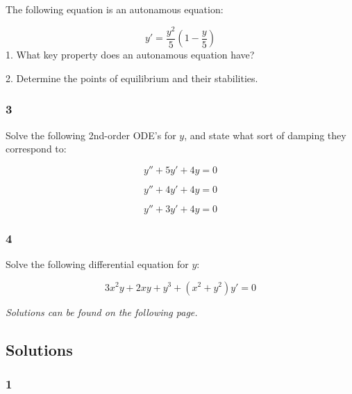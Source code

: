 The following equation is an autonamous equation:

\begin{equation}
    y'=\frac{y^2}{5}(1-\frac{y}{5})
\end{equation}
1. What key property does an autonamous equation have?


2. Determine the points of equilibrium and their stabilities.





\subsubsection{3}

Solve the following 2nd-order ODE's for $y$, and state what sort of damping they correspond to:

\begin{equation}
    y'' + 5 y' + 4y = 0 %
\end{equation}


\begin{equation}
    y'' + 4 y' + 4 y = 0 %
\end{equation}


\begin{equation}
    y'' + 3 y' + 4 y = 0 %
\end{equation}




\subsubsection{4}

Solve the following differential equation for $y$:

\begin{equation}
    3 x^2 y + 2 x y + y^3 + (x^2 + y^2) y' = 0
\end{equation}




\vspace{2cm}

\emph{Solutions can be found on the following page.}
\newpage

\subsection{Solutions}

\subsubsection{1}

